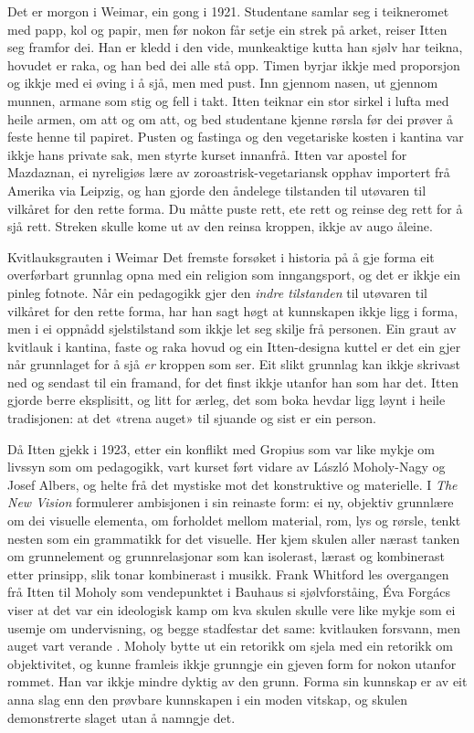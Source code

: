 Det er morgon i Weimar, ein gong i 1921. Studentane samlar seg i teikneromet med papp, kol og papir, men før nokon får setje ein strek på arket, reiser Itten seg framfor dei. Han er kledd i den vide, munkeaktige kutta han sjølv har teikna, hovudet er raka, og han bed dei alle stå opp. Timen byrjar ikkje med proporsjon og ikkje med ei øving i å sjå, men med pust. Inn gjennom nasen, ut gjennom munnen, armane som stig og fell i takt. Itten teiknar ein stor sirkel i lufta med heile armen, om att og om att, og bed studentane kjenne rørsla før dei prøver å feste henne til papiret. Pusten og fastinga og den vegetariske kosten i kantina var ikkje hans private sak, men styrte kurset innanfrå. Itten var apostel for Mazdaznan, ei nyreligiøs lære av zoroastrisk-vegetariansk opphav importert frå Amerika via Leipzig, og han gjorde den åndelege tilstanden til utøvaren til vilkåret for den rette forma. Du måtte puste rett, ete rett og reinse deg rett for å sjå rett. Streken skulle kome ut av den reinsa kroppen, ikkje av augo åleine.

\begin{kasus}{Kvitlauksgrauten i Weimar}
Det fremste forsøket i historia på å gje forma eit overførbart grunnlag opna med ein religion som inngangsport, og det er ikkje ein pinleg fotnote. Når ein pedagogikk gjer den \emph{indre tilstanden} til utøvaren til vilkåret for den rette forma, har han sagt høgt at kunnskapen ikkje ligg i forma, men i ei oppnådd sjelstilstand som ikkje let seg skilje frå personen. Ein graut av kvitlauk i kantina, faste og raka hovud og ein Itten-designa kuttel er det ein gjer når grunnlaget for å sjå \emph{er} kroppen som ser. Eit slikt grunnlag kan ikkje skrivast ned og sendast til ein framand, for det finst ikkje utanfor han som har det. Itten gjorde berre eksplisitt, og litt for ærleg, det som boka hevdar ligg løynt i heile tradisjonen: at det «trena auget» til sjuande og sist er ein person.
\end{kasus}

Då Itten gjekk i 1923, etter ein konflikt med Gropius som var like mykje om livssyn som om pedagogikk, vart kurset ført vidare av László Moholy-Nagy og Josef Albers, og helte frå det mystiske mot det konstruktive og materielle. I \textit{The New Vision} formulerer \textcite{moholy1947vision} ambisjonen i sin reinaste form: ei ny, objektiv grunnlære om dei visuelle elementa, om forholdet mellom material, rom, lys og rørsle, tenkt nesten som ein grammatikk for det visuelle. Her kjem skulen aller nærast tanken om grunnelement og grunnrelasjonar som kan isolerast, lærast og kombinerast etter prinsipp, slik tonar kombinerast i musikk. Frank Whitford les overgangen frå Itten til Moholy som vendepunktet i Bauhaus si sjølvforståing, Éva Forgács viser at det var ein ideologisk kamp om kva skulen skulle vere like mykje som ei usemje om undervisning, og begge stadfestar det same: kvitlauken forsvann, men auget vart verande \autocite{whitford1984bauhaus,forgacs1995bauhaus}. Moholy bytte ut ein retorikk om sjela med ein retorikk om objektivitet, og kunne framleis ikkje grunngje ein gjeven form for nokon utanfor rommet. Han var ikkje mindre dyktig av den grunn. Forma sin kunnskap er av eit anna slag enn den prøvbare kunnskapen i ein moden vitskap, og skulen demonstrerte slaget utan å namngje det.

